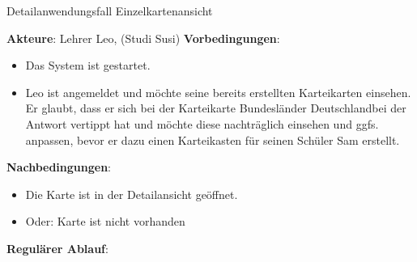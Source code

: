 \begin{answer}
    Detailanwendungsfall Einzelkartenansicht 
\end{answer}
\newline
\textbf{Akteure}: Lehrer Leo, (Studi Susi)
\newline
\textbf{Vorbedingungen}: 
\begin{itemize}  
    \item Das System ist gestartet.
    \item Leo ist angemeldet und möchte seine bereits erstellten Karteikarten einsehen. 
    Er glaubt, dass er sich bei der Karteikarte \dq Bundesländer Deutschland\dq bei der Antwort vertippt hat und möchte diese nachträglich einsehen und ggfs. anpassen, bevor er dazu einen Karteikasten für seinen Schüler Sam erstellt.
\end{itemize} 
\vspace{0,2cm}
\textbf{Nachbedingungen}: 
\begin{itemize}  
    \item Die Karte ist in der Detailansicht geöffnet.
    \item Oder: Karte ist nicht vorhanden
\end{itemize}
\vspace{0,5cm}
\textbf{Regulärer Ablauf}: 
